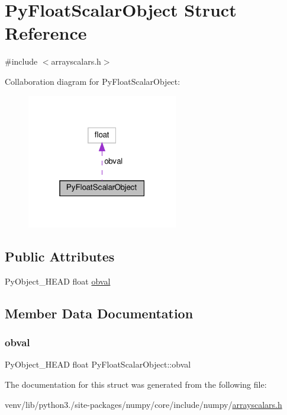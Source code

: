 \hypertarget{structPyFloatScalarObject}{}\section{Py\+Float\+Scalar\+Object Struct Reference}
\label{structPyFloatScalarObject}


{\ttfamily \#include $<$arrayscalars.\+h$>$}



Collaboration diagram for Py\+Float\+Scalar\+Object\+:
\nopagebreak
\begin{figure}[H]
\begin{center}
\leavevmode
\includegraphics[width=187pt]{structPyFloatScalarObject__coll__graph}
\end{center}
\end{figure}
\subsection*{Public Attributes}
\begin{DoxyCompactItemize}
\item 
Py\+Object\+\_\+\+H\+E\+AD float \hyperlink{structPyFloatScalarObject_a0f07f8f0f03a6da07b1ec109592d8a2b}{obval}
\end{DoxyCompactItemize}


\subsection{Member Data Documentation}
\mbox{\label{structPyFloatScalarObject_a0f07f8f0f03a6da07b1ec109592d8a2b}} 
\subsubsection{\texorpdfstring{obval}{obval}}
{\footnotesize\ttfamily Py\+Object\+\_\+\+H\+E\+AD float Py\+Float\+Scalar\+Object\+::obval}



The documentation for this struct was generated from the following file\+:\begin{DoxyCompactItemize}
\item 
venv/lib/python3./site-\/packages/numpy/core/include/numpy/\hyperlink{arrayscalars_8h}{arrayscalars.\+h}\end{DoxyCompactItemize}
